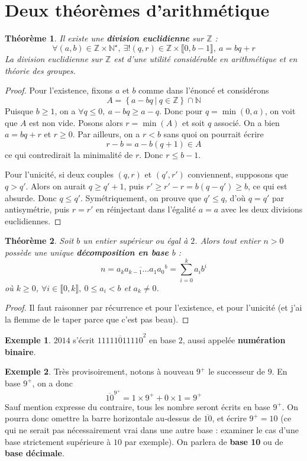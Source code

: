 \documentclass[french]{book}
\newcommand{\N}{\mathbb{N}}
\newcommand{\Z}{\mathbb{Z}}
\newcommand{\st}{^\star}
\theoremstyle{plain}
\newtheorem{thm}{Théorème}[chapter]
\theoremstyle{definition}
\newtheorem{exa}{Exemple}[chapter]
\theoremstyle{remark}
\begin{document}
\section{Deux théorèmes d'arithmétique}
\begin{thm}
	Il existe une \textbf{division euclidienne} sur $\Z$ : $$\forall (a,b)\in\Z\times\N\st,\ \exists!(q,r)\in\Z\times\llbracket0,b-1\rrbracket,\ a=bq+r$$ La division euclidienne sur $\Z$ est d'une utilité considérable en arithmétique et en théorie des groupes.
\end{thm}
\begin{proof}
	Pour l'existence, fixons $a$ et $b$ comme dans l'énoncé et considérons $$A=\left\{a-bq\ | \ q\in\Z\right\}\cap\N$$ Puisque $b\geqslant1$, on a $\forall q \leqslant0,\ a-bq\geqslant a-q$. Donc pour $q=\min(0,a)$, on voit que $A$ est non vide. Posons alors $r=\min(A)$ et soit $q$ associé. On a bien $a=bq+r$ et $r\geqslant0$. Par ailleurs, on a $r<b$ sans quoi on pourrait écrire $$r-b=a-b(q+1)\in A$$ ce qui contredirait la minimalité de $r$. Donc $r\leqslant b-1$. \par Pour l'unicité, si deux couples $(q,r)$ et $(q',r')$ conviennent, supposons que $q>q'$. Alors on aurait $q\geqslant q'+1$, puis $r'\geqslant r'-r=b(q-q')\geqslant b$, ce qui est absurde. Donc $q\leqslant q'$. Symétriquement, on prouve que $q'\leqslant q$, d'où $q=q'$ par antisymétrie, puis $r=r'$ en réinjectant dans l'égalité $a=a$ avec les deux divisions euclidiennes.
\end{proof}
\begin{thm}
	Soit $b$ un entier supérieur ou égal à $2$. Alors tout entier $n>0$ possède une unique \textbf{décomposition en base $b$} : $$n=\overline{a_k a_{k-1}\ldots a_1 a_0}^b=\sum_{i=0}^{k}a_ib^i$$ où $k\geqslant0$, $\forall i\in\llbracket0,k\rrbracket,\ 0\leqslant a_i<b$ et $a_k\ne0$.
\end{thm}
\begin{proof}
	Il faut raisonner par récurrence et pour l'existence, et pour l'unicité (et j'ai la flemme de le taper parce que c'est pas beau).
\end{proof}
\begin{exa}
	$2014$ s'écrit $\overline{11111011110}^2$ en base $2$, aussi appelée \textbf{numération binaire}.
\end{exa}
\begin{exa}
	Très provisoirement, notons à nouveau $9^+$ le successeur de $9$. En base $9^+$, on a donc $$\overline{10}^{9^+}=1\times9^++0\times 1 = 9^+$$ Sauf mention expresse du contraire, tous les nombre seront écrits en base $9^+$. On pourra donc omettre la barre horizontale au-dessus de $\overline{10}$, et écrire $9^+=10$ (ce qui ne serait pas nécessairement vrai dans une autre base : examiner le cas d'une base strictement supérieure à $10$ par exemple). On parlera de \textbf{base 10} ou de \textbf{base décimale}.	
\end{exa}
\end{document}
